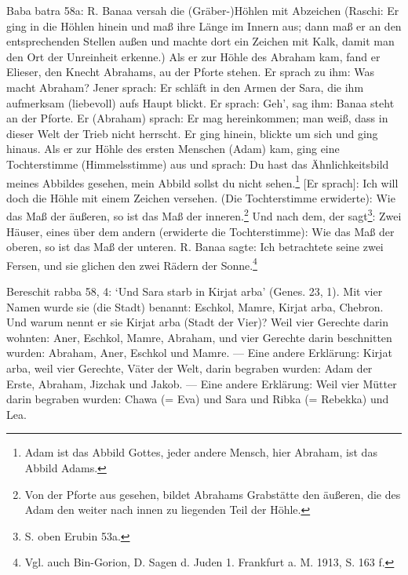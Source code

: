 \documentclass[a4paper, 11pt, oneside]{article}
\begin{document}
Baba batra 58a: R. Banaa versah die (Gräber-)Höhlen mit Abzeichen (Raschi: Er ging in die Höhlen hinein und maß ihre Länge im Innern aus; dann maß er an den entsprechenden Stellen außen und machte dort ein Zeichen mit Kalk, damit man den Ort der Unreinheit erkenne.) Als er zur Höhle des Abraham kam, fand er Elieser, den Knecht Abrahams, au der Pforte stehen. Er sprach zu ihm: Was macht Abraham? Jener sprach: Er schläft in den Armen der Sara, die ihm aufmerksam (liebevoll) aufs Haupt blickt. Er sprach: Geh', sag ihm: Banaa steht an der Pforte. Er (Abraham) sprach: Er mag hereinkommen; man weiß, dass in dieser Welt der Trieb nicht herrscht. Er ging hinein, blickte um sich und ging hinaus. Als er zur Höhle des ersten Menschen (Adam) kam, ging eine Tochterstimme (Himmelsstimme) aus und sprach: Du hast das Ähnlichkeitsbild meines Abbildes gesehen, mein Abbild sollst du nicht sehen.\footnote{Adam ist das Abbild Gottes, jeder andere Mensch, hier Abraham, ist das Abbild Adams.} [Er sprach]: Ich will doch die Höhle mit einem Zeichen versehen. (Die Tochterstimme erwiderte): Wie das Maß der äußeren, so ist das Maß der inneren.\footnote{Von der Pforte aus gesehen, bildet Abrahams Grabstätte den äußeren, die des Adam den weiter nach innen zu liegenden Teil der Höhle.} Und nach dem, der sagt\footnote{S. oben Erubin 53a.}: Zwei Häuser, eines über dem andern (erwiderte die Tochterstimme): Wie das Maß der oberen, so ist das Maß der unteren. R. Banaa sagte: Ich betrachtete seine zwei Fersen, und sie glichen den zwei Rädern der Sonne.\footnote{Vgl. auch Bin-Gorion, D. Sagen d. Juden 1. Frankfurt a. M. 1913, S. 163 f.}

Bereschit rabba 58, 4: `Und Sara starb in Kirjat arba' (Genes. 23, 1). Mit vier Namen wurde sie (die Stadt) benannt: Eschkol, Mamre, Kirjat arba, Chebron. Und warum nennt er sie Kirjat arba (Stadt der Vier)? Weil vier Gerechte darin wohnten: Aner, Eschkol, Mamre, Abraham, und vier Gerechte darin beschnitten wurden: Abraham, Aner, Eschkol und Mamre. --- Eine andere Erklärung: Kirjat arba, weil vier Gerechte, Väter der Welt, darin begraben wurden: Adam der Erste, Abraham, Jizchak und Jakob. --- Eine andere Erklärung: Weil vier Mütter darin begraben wurden: Chawa (= Eva) und Sara und Ribka (= Rebekka) und Lea.
\end{document}
